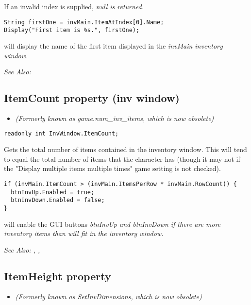 If an invalid index is supplied, \it{null} is returned.

\begin{verbatim}
String firstOne = invMain.ItemAtIndex[0].Name;
Display("First item is %s.", firstOne);
\end{verbatim}
will display the name of the first item displayed in the \it{invMain} inventory window.

\it{See Also:} 


\subsection{ItemCount property (inv window)}\label{InvWindow.ItemCount}%

\begin{itemize}
\item \it{(Formerly known as game.num_inv_items, which is now obsolete)}
\end{itemize}

\begin{verbatim}
readonly int InvWindow.ItemCount;
\end{verbatim}
Gets the total number of items contained in the inventory window. This will tend
to equal the total number of items that the character has (though it may not if
the "Display multiple items multiple times" game setting is not checked).

\begin{verbatim}
if (invMain.ItemCount > (invMain.ItemsPerRow * invMain.RowCount)) {
  btnInvUp.Enabled = true;
  btnInvDown.Enabled = false;
}
\end{verbatim}
will enable the GUI buttons \it{btnInvUp} and \it{btnInvDown} if there are more
inventory items than will fit in the inventory window.

\it{See Also:} ,
,


\subsection{ItemHeight property}\label{InvWindow.ItemHeight}%

\begin{itemize}
\item \it{(Formerly known as SetInvDimensions, which is now obsolete)}
\end{itemize}

